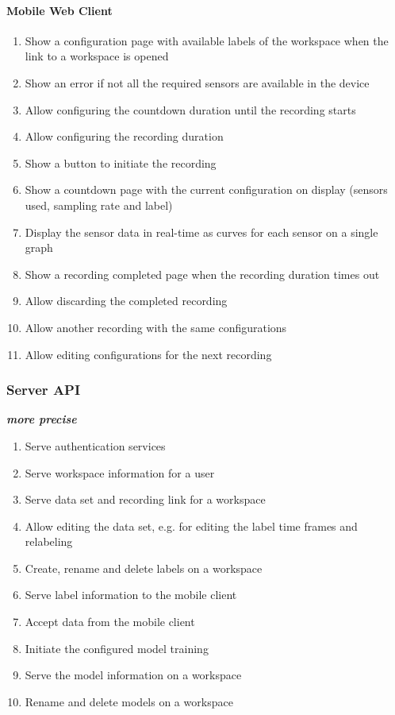 \paragraph{Mobile Web Client}
\begin{enumerate}[resume*]
    \item Show a configuration page with available labels of the workspace when the link to a workspace is opened
    \item Show an error if not all the required sensors are available in the device
    \item Allow configuring the countdown duration until the recording starts
    \item Allow configuring the recording duration
    \item Show a button to initiate the recording
    \item Show a countdown page with the current configuration on display (sensors used, sampling rate and label)
    \item Display the sensor data in real-time as curves for each sensor on a single graph
    \item Show a recording completed page when the recording duration times out
    \item Allow discarding the completed recording
    \item Allow another recording with the same configurations
    \item Allow editing configurations for the next recording
\end{enumerate}

\subsubsection{Server API} \textbf{\emph{more precise}}
\begin{enumerate}[resume*]
    \item Serve authentication services
    \item Serve workspace information for a user
    \item Serve data set and recording link for a workspace
    \item Allow editing the data set, e.g. for editing the label time frames and relabeling
    \item Create, rename and delete labels on a workspace
    \item Serve label information to the mobile client
    \item Accept data from the mobile client
    \item Initiate the configured model training
    \item Serve the model information on a workspace
    \item Rename and delete models on a workspace
\end{enumerate}

